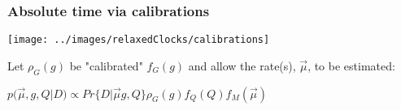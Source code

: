 \begin{frame}
\frametitle{Absolute time via calibrations}

\begin{centering}

\texttt{[image: ../images/relaxedClocks/calibrations]}

\medskip{}

\scriptsize{Let $\rho_G(g)$ be "calibrated" $f_{G}(g)$ and allow the rate(s), $\vec{\mu}$, to be estimated:}

\medskip{}

$p(\vec{\mu}, g,Q|D) \propto Pr\{D|\vec{\mu} g,Q\}\rho_{G}(g)f_{Q}(Q)f_{M}(\vec{\mu})$

\end{centering}

\end{frame}